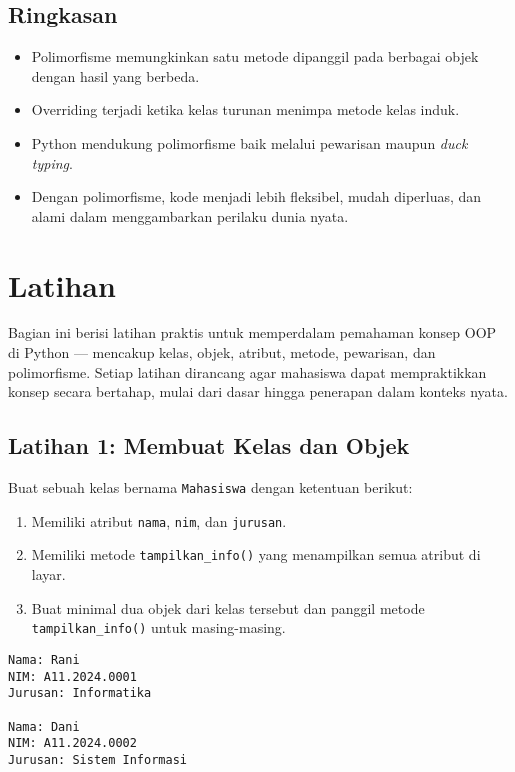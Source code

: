 \subsection*{Ringkasan}
\begin{itemize}
    \item Polimorfisme memungkinkan satu metode dipanggil pada berbagai objek dengan hasil yang berbeda.
    \item Overriding terjadi ketika kelas turunan menimpa metode kelas induk.
    \item Python mendukung polimorfisme baik melalui pewarisan maupun \emph{duck typing}.
    \item Dengan polimorfisme, kode menjadi lebih fleksibel, mudah diperluas, dan alami dalam menggambarkan perilaku dunia nyata.
\end{itemize}

\section{Latihan}

Bagian ini berisi latihan praktis untuk memperdalam pemahaman konsep OOP di Python — mencakup kelas, objek, atribut, metode, pewarisan, dan polimorfisme.  
Setiap latihan dirancang agar mahasiswa dapat mempraktikkan konsep secara bertahap, mulai dari dasar hingga penerapan dalam konteks nyata.

\subsection*{Latihan 1: Membuat Kelas dan Objek}
Buat sebuah kelas bernama \texttt{Mahasiswa} dengan ketentuan berikut:
\begin{enumerate}
    \item Memiliki atribut \texttt{nama}, \texttt{nim}, dan \texttt{jurusan}.
    \item Memiliki metode \texttt{tampilkan\_info()} yang menampilkan semua atribut di layar.
    \item Buat minimal dua objek dari kelas tersebut dan panggil metode \texttt{tampilkan\_info()} untuk masing-masing.
\end{enumerate}

\begin{lstlisting}[style=PythonStyle, caption={Contoh keluaran yang diharapkan (tidak harus identik)}]
Nama: Rani
NIM: A11.2024.0001
Jurusan: Informatika

Nama: Dani
NIM: A11.2024.0002
Jurusan: Sistem Informasi
\end{lstlisting}

